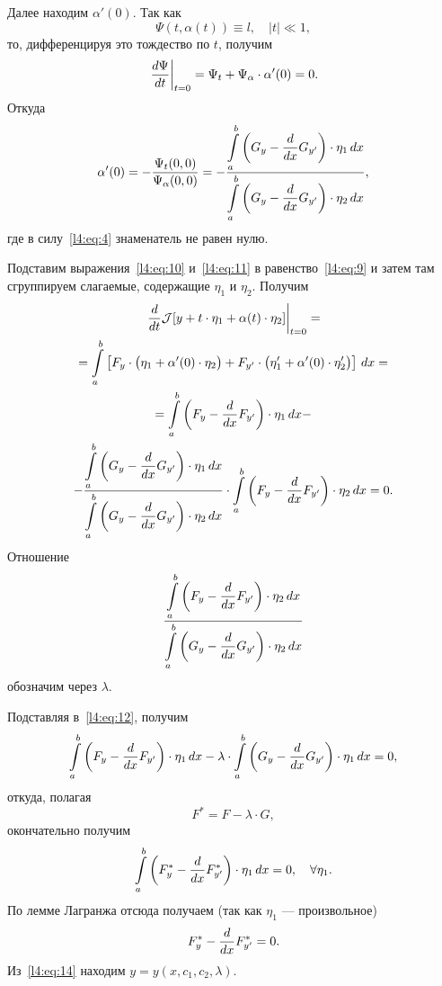 Далее находим $\alpha'(0)$. Так как 
\begin{equation*}
	\Psi(t,\alpha(t))\equiv l,\quad|t|\ll1,
\end{equation*}
то, дифференцируя это тождество по $t$, получим
\begin{equation*}
	\left.\frac{d\Psi}{dt}\right|_{t=0}=\Psi_t+\Psi_{\alpha}\cdot\alpha'(0)=0.
\end{equation*}
Откуда
\begin{equation}
	\label{l4:eq:11}
	\alpha'(0)=-\frac{\Psi_t(0,0)}{\Psi_{\alpha}(0,0)}=-\frac{\displaystyle\int\limits_a^b\left(G_y-\frac{d}{dx}G_{y'}\right)\cdot\eta_1\,dx}{\displaystyle\int\limits_a^b\left(G_y-\frac{d}{dx}G_{y'}\right)\cdot\eta_2\,dx},
\end{equation}
где в силу~\eqref{l4:eq:4} знаменатель не равен нулю.

Подставим выражения~\eqref{l4:eq:10} и~\eqref{l4:eq:11} в равенство~\eqref{l4:eq:9} и затем там сгруппируем слагаемые, содержащие $\eta_1$ и $\eta_2$. Получим
\begin{multline}
	\label{l4:eq:12}
	\left.\frac{d}{dt}\mathcal{J}[y+t\cdot\eta_1+\alpha(t)\cdot\eta_2]\right|_{t=0}=\\=\int\limits_a^b\left[F_y\cdot\big(\eta_1+\alpha'(0)\cdot\eta_2\big)+F_{y'}\cdot\big(\eta'_1+\alpha'(0)\cdot\eta'_2\big)\right]\,dx=\\=
	\int\limits_a^b\left(F_y-\frac{d}{dx}F_{y'}\right)\cdot\eta_1\,dx-\\-\frac{\displaystyle\int\limits_a^b\left(G_y-\frac{d}{dx}G_{y'}\right)\cdot\eta_1\,dx}{\displaystyle\int\limits_a^b\left(G_y-\frac{d}{dx}G_{y'}\right)\cdot\eta_2\,dx}\cdot\int\limits_a^b\left(F_y-\frac{d}{dx}F_{y'}\right)\cdot\eta_2\,dx=0.
\end{multline} 
 Отношение
\begin{equation*}
	\frac{\displaystyle\int\limits_a^b\left(F_y-\frac{d}{dx}F_{y'}\right)\cdot\eta_2\,dx}{\displaystyle\int\limits_a^b\left(G_y-\frac{d}{dx}G_{y'}\right)\cdot\eta_2\,dx}
\end{equation*}
обозначим через $\lambda$.

Подставляя в~\eqref{l4:eq:12}, получим
\begin{equation*}
	\int\limits_a^b\left(F_y-\frac{d}{dx}F_{y'}\right)\cdot\eta_1\,dx-\lambda\cdot\int\limits_a^b\left(G_y-\frac{d}{dx}G_{y'}\right)\cdot\eta_1\,dx=0,
\end{equation*} 
откуда{\mb,} полагая
\begin{equation*}
	 F^{\ast}=F-\lambda\cdot G,
\end{equation*}
окончательно получим
\begin{equation}
	\label{l4:eq:13}
	\int\limits_a^b\left(F^{\ast}_y-\frac{d}{dx}F^{\ast}_{y'}\right)\cdot\eta_1\,dx=0,\quad\forall\eta_1.
\end{equation} 
По лемме Лагранжа отсюда получаем (так как $\eta_1$ --- произвольное)
\begin{equation}
	\label{l4:eq:14}
	 F^{\ast}_y-\frac{d}{dx}F^{\ast}_{y'}=0.
\end{equation}
Из~\eqref{l4:eq:14} находим $y=y(x,c_1,c_2,\lambda)$. 

